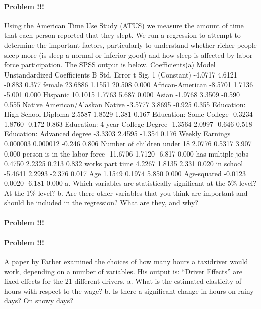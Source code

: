 \documentclass[]{article}
\let\oldparagraph\paragraph
\renewcommand{\paragraph}[1]{\oldparagraph{#1}\mbox{}}
\begin{document}
\paragraph{Problem !!!}\label{problem-9}

Using the American Time Use Study (ATUS) we measure the amount of time
that each person reported that they slept. We run a regression to
attempt to determine the important factors, particularly to understand
whether richer people sleep more (is sleep a normal or inferior good)
and how sleep is affected by labor force participation. The SPSS output
is below. Coefficients(a) Model Unstandardized Coefficients B Std. Error
t Sig. 1 (Constant) -4.0717 4.6121 -0.883 0.377 female 23.6886 1.1551
20.508 0.000 African-American -8.5701 1.7136 -5.001 0.000 Hispanic
10.1015 1.7763 5.687 0.000 Asian -1.9768 3.3509 -0.590 0.555 Native
American/Alaskan Native -3.5777 3.8695 -0.925 0.355 Education: High
School Diploma 2.5587 1.8529 1.381 0.167 Education: Some College -0.3234
1.8760 -0.172 0.863 Education: 4-year College Degree -1.3564 2.0997
-0.646 0.518 Education: Advanced degree -3.3303 2.4595 -1.354 0.176
Weekly Earnings 0.000003 0.000012 -0.246 0.806 Number of children under
18 2.0776 0.5317 3.907 0.000 person is in the labor force -11.6706
1.7120 -6.817 0.000 has multiple jobs 0.4750 2.2325 0.213 0.832 works
part time 4.2267 1.8135 2.331 0.020 in school -5.4641 2.2993 -2.376
0.017 Age 1.1549 0.1974 5.850 0.000 Age-squared -0.0123 0.0020 -6.181
0.000 a. Which variables are statistically significant at the 5\% level?
At the 1\% level? b. Are there other variables that you think are
important and should be included in the regression? What are they, and
why?

\paragraph{Problem !!!}\label{problem-10}

\paragraph{Problem !!!}\label{problem-13}

A paper by Farber examined the choices of how many hours a taxidriver
would work, depending on a number of variables. His output is: ``Driver
Effects'' are fixed effects for the 21 different drivers. a. What is the
estimated elasticity of hours with respect to the wage? b. Is there a
significant change in hours on rainy days? On snowy days?
\end{document}
